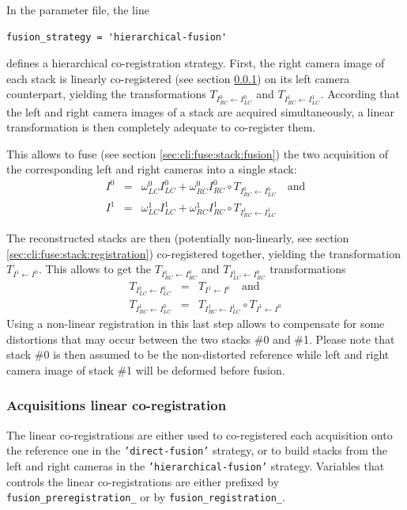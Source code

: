 In the parameter file, the line
\begin{verbatim}
fusion_strategy = 'hierarchical-fusion'
\end{verbatim}
defines a hierarchical  co-registration  strategy. First, the right camera image of each stack is linearly co-registered (see section \ref{sec:cli:fuse:acquisition:registration}) on its left camera counterpart, yielding the transformations
$T_{I^{0}_{RC} \leftarrow I^{0}_{LC}}$ and
$T_{I^{1}_{RC} \leftarrow I^{1}_{LC}}$.
According that the left and right camera images of a stack are acquired simultaneously, a linear transformation is then completely adequate to co-register them.

This allows to fuse (see section \ref{sec:cli:fuse:stack:fusion}) the two acquisition of the corresponding left and right cameras into a single stack:
\begin{eqnarray*}
I^{0} & = & \omega^{0}_{LC} I^{0}_{LC} 
          + \omega^{0}_{RC} I^{0}_{RC} \circ T_{I^{0}_{RC} \leftarrow I^{0}_{LC}} \quad \textrm{and} \\
I^{1} & = & \omega^{1}_{LC} I^{1}_{LC} 
          + \omega^{1}_{RC} I^{1}_{RC} \circ T_{I^{1}_{RC} \leftarrow I^{1}_{LC}}                         
\end{eqnarray*}

The reconstructed stacks are then (potentially non-linearly, see section \ref{sec:cli:fuse:stack:registration}) co-registered together, yielding the transformation $T_{I^{1} \leftarrow I^{0}}$. This allows to get the 
$T_{I^{1}_{RC} \leftarrow I^{0}_{RC}}$ and
$T_{I^{1}_{LC} \leftarrow I^{0}_{RC}}$ transformations 
\begin{eqnarray*}
T_{I^{1}_{LC} \leftarrow I^{0}_{LC}} & = & T_{I^{1} \leftarrow I^{0}} \quad \textrm{and} \\
T_{I^{1}_{RC} \leftarrow I^{0}_{LC}} & = &
T_{I^{1}_{RC} \leftarrow I^{1}_{LC}} \circ T_{I^{1} \leftarrow I^{0}}                      
\end{eqnarray*}
Using a non-linear registration in this last step allows to compensate for some distortions that may occur between the two stacks \#0 and \#1. Please note that stack \#0 is then assumed to be the non-distorted reference while left and right camera image of stack \#1 will be deformed before fusion.


\subsubsection{Acquisitions linear co-registration}
\label{sec:cli:fuse:acquisition:registration}
The linear co-registrations are either used to co-registered each acquisition onto the reference one in the \texttt{'direct-fusion'} strategy, or to build stacks from the left and right cameras in the \texttt{'hierarchical-fusion'} strategy.
Variables that controls the linear co-registrations are either prefixed by \texttt{fusion\_preregistration\_} or by \texttt{fusion\_registration\_}.

